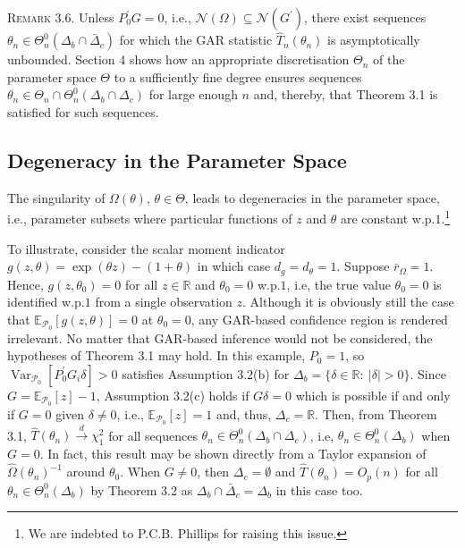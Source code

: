 \documentclass[hidelinks, 11 pt, a4paper, pdflatex]{article}
\DeclareMathOperator{\Var}{Var}
\begin{document}
{   \textsc{Remark 3.6}. Unless $P_{0}^{\prime}G = 0$, i.e., $\mathcal{N}(\Omega) \subseteq \mathcal{N}(G^{\prime})$, there exist
    sequences $\theta_{n} \in \Theta _{n}^{0}(\Delta_{b} \cap \bar{\Delta}_{c})$ for which the GAR statistic $\hat{T}_{n}(\theta_{n})$ is asymptotically unbounded. Section 4 shows how an appropriate discretisation $\Theta_{n}$ of the parameter space $\Theta$ to a sufficiently fine degree ensures sequences $\theta_n \in \Theta_{n} \cap \Theta_{n}^{0}(\Delta_{b} \cap \Delta_{c})$ for large enough $n$ and, thereby, that Theorem 3.1 is satisfied for such sequences.


  \subsection{Degeneracy in the Parameter Space}
	
   The singularity of $\Omega(\theta)$, $\theta \in \Theta$, leads to degeneracies in the parameter space, i.e., parameter subsets where particular functions of $z$ and $\theta$ are constant w.p.$1$.\footnote{We are indebted to P.C.B. Phillips for raising this issue.}
	
   To illustrate, consider the scalar moment indicator $g(z,\theta) = \exp(\theta z) - (1+\theta)$ in which case $d_g = d_\theta = 1$. Suppose $\bar{r}_{\Omega} = 1$. Hence, $g(z,\theta_0) = 0$ for all $z \in \mathbb{R}$ and $\theta_0 = 0$ w.p.$1$, i.e, the true value $\theta_0 = 0$ is identified w.p.$1$ from a single observation $z$. Although it is obviously still the case that $\mathbb{E}_{\mathcal{P}_0}[g(z,\theta)] = 0$ at $\theta_0 = 0$, any GAR-based confidence region is rendered irrelevant.
   No matter that GAR-based inference would not be considered, the hypotheses of Theorem 3.1 may hold. In this example, $P_0 = 1$, so $\Var_{\mathcal{P}_0}[P_0^{\prime}G_i\delta] > 0$ satisfies Assumption 3.2(b) for $\Delta_b = \{\delta \in \mathbb{R}:~|\delta| > 0\}$. Since $G = \mathbb{E}_{\mathcal{P}_0}[z] - 1$, Assumption 3.2(c) holds if $G\delta = 0$ which is possible if and only if $G = 0$ given $\delta \neq 0$, i.e., $\mathbb{E}_{\mathcal{P}_0}[z] = 1$ and, thus, $\Delta_c = \mathbb{R}$. Then, from Theorem 3.1, $\hat{T}(\theta_n) \overset{d}{\rightarrow} \chi_1^{2}$ for all sequences $\theta_n \in \Theta_n^{0}(\Delta_b \cap \Delta_c)$, i.e, $\theta_n \in \Theta_n^{0}(\Delta_b)$ when $G = 0$. In fact, this result may be shown directly from a Taylor expansion of $\hat{\Omega}(\theta_n)^{-1}$ around $\theta_0$. When $G \neq 0$, then $\Delta_c = \emptyset$ and $\hat{T}(\theta_n) = O_p(n)$ for all $\theta_n \in \Theta_n^{0}(\Delta_b)$ by Theorem 3.2 as $\Delta_b \cap \bar{\Delta}_c = \Delta_b$ in this case too.	
	
}
\end{document}
